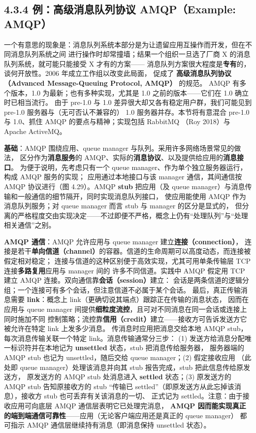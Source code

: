 
\subsection*{4.3.4 例：高级消息队列协议 AMQP（Example: AMQP）}
一个有意思的现象是：消息队列系统本部分是为让遗留应用互操作而开发，但在不同消息队列系统之间
进行操作时却常撞墙；结果一个组织一旦选了厂商 X 的消息队列系统，就可能只能接受 X 才有的方案——
消息队列方案很大程度是\textbf{专有}的，谈何开放性。2006 年成立工作组以改变此局面，
促成了 \textbf{高级消息队列协议（Advanced Message-Queuing Protocol, AMQP）} 的规范。
AMQP 有多个版本，1.0 为最新；也有多种实现，尤其是 1.0 之前的版本——它们在 1.0 确立时已相当流行。
由于 pre-1.0 与 1.0 差异很大却又各有稳定用户群，我们可能见到 pre-1.0 服务器与（无可否认不兼容的）
1.0 服务器并存。本节将有意混合 pre-1.0 与 1.0、抓住 AMQP 的要点与精神；实现包括 RabbitMQ
（Roy 2018）与 Apache ActiveMQ。

\medskip\noindent\textbf{基础}：AMQP 围绕应用、queue manager 与队列。采用许多网络场景常见的做法，
区分作为\textbf{消息服务}的 AMQP、实际的\textbf{消息协议}、以及提供给应用的\textbf{消息接口}。
为便于说明，先考虑只有一个 queue manager、作为单个独立服务器运行，构成 AMQP 服务的实现；
应用通过本地接口与该 manager 通信，其间通信按 AMQP 协议进行（图 4.29）。AMQP \textbf{stub}
把应用（及 queue manager）与消息传输和一般通信的细节隔开，同时实现消息队列接口，
使应用能使用 AMQP 作为消息队列服务；对 queue manager 而言 stub 与 manager 的区分是显式的，
但分离的严格程度交由实现决定——不过即便不严格，概念上仍有“处理队列”与“处理相关通信”之别。

\medskip\noindent\textbf{AMQP 通信}：AMQP 允许应用与 queue manager 建立\textbf{连接（connection）}，
连接是若干\textbf{单向信道（channel）}的容器。信道的生命周期可以高度动态，而连接被假定相对稳定；
连接与信道的这种区别便于高效实现，尤其可用单条传输层 TCP 连接\textbf{多路复用}应用与 manager 间的
许多不同信道。实践中 AMQP 假定用 TCP 建立 AMQP 连接。双向通信靠\textbf{会话（session）}建立：
会话是两条信道的逻辑分组；一个连接可有多个会话，但注意信道不必属于某个会话。
最后，真正传输消息需要 \textbf{link}：概念上 link（更确切说其端点）跟踪正在传输的消息状态，
因而在应用与 queue manager 间提供\textbf{细粒度流控}，且可对不同消息在同一会话或连接上同时施加不同
控制策略；流控靠\textbf{信用（credit）}建立——接收方可告诉发送方它被允许在特定 link 上发多少消息。
传消息时应用把消息交给本地 AMQP stub，每次消息传输关联一个特定 link。消息传输通常分三步：
(1) 发送方给消息分配唯一标识符并在本地记为 \textbf{unsettled} 状态，stub 把消息传给服务器，
服务器端的 AMQP stub 也记为 unsettled，随后交给 queue manager；(2) 假定接收应用
（此处即 queue manager）处理该消息并向其 stub 报告完成，stub 把此信息传给原发送方，
原发送方的 AMQP stub 处消息进入 \textbf{settled} 状态；(3) 原发送方的 AMQP stub 告知原接收方的 stub
“传输已 settled”（即原发送方从此忘掉该消息），接收方 stub 也可丢弃有关该消息的一切、
正式记为 settled。注意：由于接收应用可向底层 AMQP 通信层表明它已处理完消息，
\textbf{AMQP 因而能实现真正的端到端通信可靠性}——应用（无论客户端应用还是真正的 queue manager）
都可指示 AMQP 通信层继续持有消息（即消息保持 unsettled 状态）。

